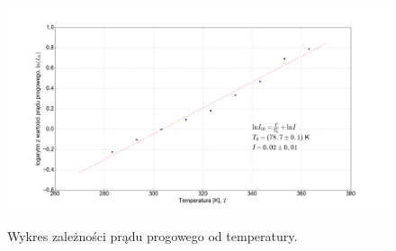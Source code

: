 \documentclass[a4paper, portrait,12pt]{report}
\begin{document}
\begin{figure}
\center
  \includegraphics[scale=0.30]{plot980/fit_i_th.png}
  \label{rys1}
  \caption{Wykres zależności prądu progowego od temperatury.} 
\end{figure}
\end{document}
